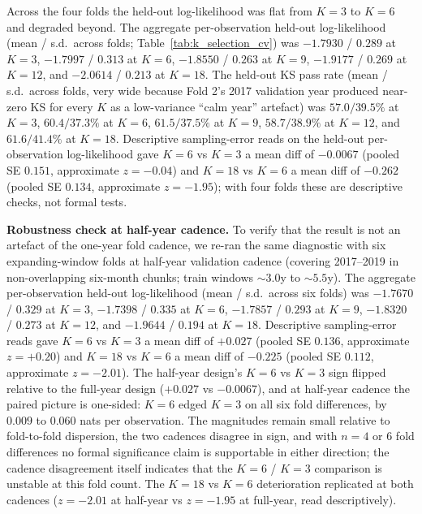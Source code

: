 Across the four folds the held-out log-likelihood was flat from $K = 3$ to $K = 6$ and degraded beyond. The aggregate per-observation held-out log-likelihood (mean / s.d.\ across folds; Table~\ref{tab:k_selection_cv}) was $-1.7930$ / $0.289$ at $K = 3$, $-1.7997$ / $0.313$ at $K = 6$, $-1.8550$ / $0.263$ at $K = 9$, $-1.9177$ / $0.269$ at $K = 12$, and $-2.0614$ / $0.213$ at $K = 18$. The held-out KS pass rate (mean / s.d.\ across folds, very wide because Fold 2's 2017 validation year produced near-zero KS for every $K$ as a low-variance ``calm year'' artefact) was $57.0 / 39.5\%$ at $K = 3$, $60.4 / 37.3\%$ at $K = 6$, $61.5 / 37.5\%$ at $K = 9$, $58.7 / 38.9\%$ at $K = 12$, and $61.6 / 41.4\%$ at $K = 18$. Descriptive sampling-error reads on the held-out per-observation log-likelihood gave $K = 6$ vs $K = 3$ a mean diff of $-0.0067$ (pooled SE $0.151$, approximate $z = -0.04$) and $K = 18$ vs $K = 6$ a mean diff of $-0.262$ (pooled SE $0.134$, approximate $z = -1.95$); with four folds these are descriptive checks, not formal tests.

\textbf{Robustness check at half-year cadence.} To verify that the result is not an artefact of the one-year fold cadence, we re-ran the same diagnostic with six expanding-window folds at half-year validation cadence (covering 2017--2019 in non-overlapping six-month chunks; train windows $\sim 3.0$y to $\sim 5.5$y). The aggregate per-observation held-out log-likelihood (mean / s.d.\ across six folds) was $-1.7670$ / $0.329$ at $K = 3$, $-1.7398$ / $0.335$ at $K = 6$, $-1.7857$ / $0.293$ at $K = 9$, $-1.8320$ / $0.273$ at $K = 12$, and $-1.9644$ / $0.194$ at $K = 18$. Descriptive sampling-error reads gave $K = 6$ vs $K = 3$ a mean diff of $+0.027$ (pooled SE $0.136$, approximate $z = +0.20$) and $K = 18$ vs $K = 6$ a mean diff of $-0.225$ (pooled SE $0.112$, approximate $z = -2.01$). The half-year design's $K = 6$ vs $K = 3$ sign flipped relative to the full-year design ($+0.027$ vs $-0.0067$), and at half-year cadence the paired picture is one-sided: $K = 6$ edged $K = 3$ on all six fold differences, by $0.009$ to $0.060$ nats per observation. The magnitudes remain small relative to fold-to-fold dispersion, the two cadences disagree in sign, and with $n = 4$ or $6$ fold differences no formal significance claim is supportable in either direction; the cadence disagreement itself indicates that the $K = 6$ / $K = 3$ comparison is unstable at this fold count. The $K = 18$ vs $K = 6$ deterioration replicated at both cadences ($z = -2.01$ at half-year vs $z = -1.95$ at full-year, read descriptively).

